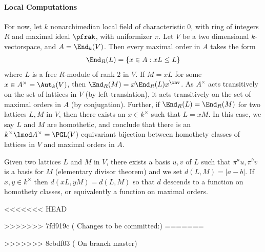\documentclass[draft]{amsart}
\begin{document}
\paragraph*{Local Computations}
For now, let $k$ nonarchimedian local field of characteristic $0$, with ring of integers $R$ and maximal ideal $\pfrak$, with uniformizer $\pi$. Let $V$ be a two dimensional $k$-vectorspace, and $A = \End_k(V)$. Then every maximal order in $A$ takes the form
\begin{align*}
    \End_R(L) = \{ x \in A : xL\leq L\}
\end{align*}
where $L$ is a free $R$-module of rank $2$ in $V$. If $M = xL$ for some $x\in A^\times = \Aut_k(V)$, then $\End_R(M) = x\End_R(L)x^\inv$. As $A^\times$ acts transitively on the set of lattices in $V$ (by left-translation), it acts transitively on the set of maximal orders in $A$ (by conjugation). Further, if $\End_R(L)=\End_R(M)$ for two lattices $L,M$ in $V$, then there exists an $x \in k^\times$ such that $L = x M$. In this case, we say $L$ and $M$ are homothetic, and conclude that there is an $k^\times \lmod A^\times = \PGL(V)$ equivariant bijection between homothety classes of lattices in $V$ and maximal orders in $A$.

Given two lattices $L$ and $M$ in $V$, there exists a basis $u,v$ of $L$ such that $\pi^a u , \pi^b v$ is a basis for $M$ (elementary divisor theorem) and we set $d(L,M) = |a-b|$. If $x,y\in k^\times$ then $d(xL,yM)=d(L,M)$ so that $d$ descends to a function on homothety classes, or equivalently a function on maximal orders.


<<<<<<< HEAD
\cite{sallyFourierTransformOrbital1983}


>>>>>>> 7fd919c ( Changes to be committed:)
=======

>>>>>>> 8cbdf03 ( On branch master)
\end{document}
